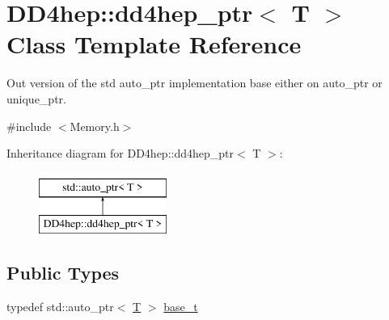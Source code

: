 \hypertarget{class_d_d4hep_1_1dd4hep__ptr}{}\section{D\+D4hep\+:\+:dd4hep\+\_\+ptr$<$ T $>$ Class Template Reference}
\label{class_d_d4hep_1_1dd4hep__ptr}


Out version of the std auto\+\_\+ptr implementation base either on auto\+\_\+ptr or unique\+\_\+ptr.  




{\ttfamily \#include $<$Memory.\+h$>$}

Inheritance diagram for D\+D4hep\+:\+:dd4hep\+\_\+ptr$<$ T $>$\+:\begin{figure}[H]
\begin{center}
\leavevmode
\includegraphics[height=2.000000cm]{class_d_d4hep_1_1dd4hep__ptr}
\end{center}
\end{figure}
\subsection*{Public Types}
\begin{DoxyCompactItemize}
\item 
typedef std\+::auto\+\_\+ptr$<$ \hyperlink{class_t}{T} $>$ \hyperlink{class_d_d4hep_1_1dd4hep__ptr_a4bcbed2d2a920d0a5ffbf405263fe8d6}{base\+\_\+t}
\end{DoxyCompactItemize}
